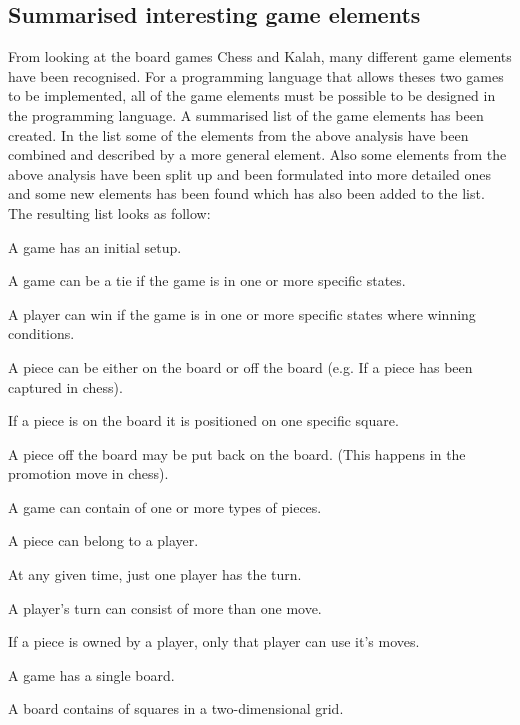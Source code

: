 \subsection{Summarised interesting game elements}
\label{subsec:differences}

From looking at the board games Chess and Kalah, many different game elements have been recognised. For a programming language that allows theses two games to be implemented, all of the game elements must be possible to be designed in the programming language. A summarised list of the game elements has been created. In the list some of the elements from the above analysis have been combined and described by a more general element. Also some elements from the above analysis have been split up and been formulated into more detailed ones and some new elements has been found which has also been added to the list. The resulting list looks as follow:  

\begin{dlist}
  	\item A game has an initial setup.
  	\item A game can be a tie if the game is in one or more specific states.
  	\item A player can win if the game is in one or more specific states where winning conditions. 
  	\item A piece can be either on the board or off the board (e.g. If a piece has been captured in chess).
  		\begin{dlist}
  			\item If a piece is on the board it is positioned on one specific square.
  			\item A piece off the board may be put back on the board. (This happens in the promotion move in chess).
  		\end{dlist}
  	\item A game can contain of one or more types of pieces.
  	\item A piece can belong to a player.
  	\item At any given time, just one player has the turn.
  	\item A player's turn can consist of more than one move.
  	\item If a piece is owned by a player, only that player can use it's moves.
  	\item A game has a single board.
  	\item A board contains of squares in a two-dimensional grid.
\end{dlist}

